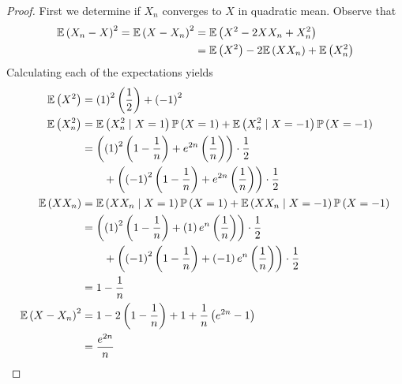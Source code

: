 \documentclass[a4paper]{article}
\begin{document}
\begin{proof}[Proof] 
First we determine if \(X_{n}\) converges to \(X\) in quadratic mean. Observe that
\begin{align*}
	\mathbb{E}\left( X_{n} - X \right)^{2} = \mathbb{E}\left( X - X_{n} \right)^{2} 	& = \mathbb{E}\left( X^{2} - 2 X X_{n} + X^{2}_{n} \right) \\	
	 & = \mathbb{E}\left( X^{2} \right) - 2 \mathbb{E}\left( X X_{n} \right) + \mathbb{E}\left( X^{2}_{n} \right) \\ 
\end{align*}
Calculating each of the expectations yields
\begin{align*}
	\mathbb{E}\left( X^{2} \right) & = \left( 1 \right)^{2} \left( \frac{1}{2} \right) + \left( -1 \right)^{2}  \\
	\mathbb{E}\left( X^{2}_{n} \right) & = \mathbb{E}\left( X^{2}_{n} \mid X = 1 \right) \mathbb{P}\left( X = 1 \right) + \mathbb{E}\left( X^{2}_{n} \mid X = -1 \right) \mathbb{P}\left( X = -1 \right) \\
		   & = \left( \left( 1 \right)^{2} \left( 1 - \frac{1}{n} \right) + e^{2n} \left( \frac{1}{n} \right)  \right) \cdot \frac{1}{2} \\
		   & \qquad + \left( \left( -1 \right)^{2} \left( 1 - \frac{1}{n} \right) + e^{2n} \left( \frac{1}{n} \right)  \right) \cdot \frac{1}{2} \\
	\mathbb{E}\left( X X_{n} \right) & = \mathbb{E}\left( X X_{n} \mid X = 1 \right) \mathbb{P}\left( X = 1 \right) + \mathbb{E}\left( X X_{n} \mid X = -1 \right) \mathbb{P}\left( X = -1 \right) \\
	 & = \left( \left( 1 \right)^{2} \left( 1 - \frac{1}{n} \right) + \left( 1 \right) e^{n} \left( \frac{1}{n} \right)  \right) \cdot \frac{1}{2} \\
	 & \qquad + \left( \left( -1 \right)^{2} \left( 1 - \frac{1}{n} \right)  + \left( -1 \right) e^{n} \left( \frac{1}{n} \right)  \right) \cdot \frac{1}{2} \\
	 & = 1 - \frac{1}{n} \\
	\mathbb{E}\left( X - X_{n} \right)^{2} & = 1 - 2 \left( 1 - \frac{1}{n} \right) + 1 + \frac{1}{n} \left( e^{2n} - 1 \right) \\
	 & = \frac{e^{2n}}{n}
\end{align*}


\end{proof}
\end{document}
